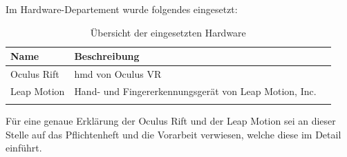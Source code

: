 Im Hardware-Departement wurde folgendes eingesetzt:

\begin{table}[H]
	\caption{Übersicht der eingesetzten Hardware}
	\centering
	\label{tab:hardware}
	\begin{tabular}{ l l l }
		\noalign{\smallskip} \hline \hline \noalign{\smallskip}
		\textbf{Name} & \textbf{Beschreibung} \\ \midrule
		Oculus Rift & \gls{hmd} von Oculus VR \\
		Leap Motion & Hand- und Fingererkennungsgerät von Leap Motion, Inc. \\
		\noalign{\smallskip} \hline \noalign{\smallskip}
	\end{tabular}
\end{table}

Für eine genaue Erklärung der Oculus Rift und der Leap Motion sei an dieser Stelle auf das Pflichtenheft und die Vorarbeit verwiesen, welche diese im Detail einführt.
